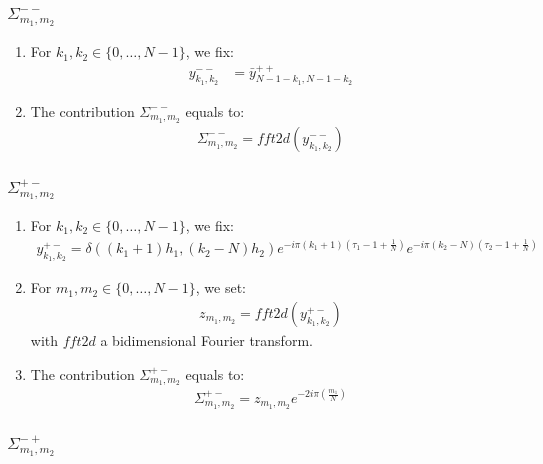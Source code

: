 \subsubsection{\texorpdfstring{$\Sigma_{m_1,m_2}^{--}$}{sigma--}}

\begin{enumerate}
\item For $k_1,k_2\in\{0,\hdots,N-1\}$, we fix:
\begin{align*}
y^{--}_{k_1,k_2}&=\bar{y}^{++}_{N-1-k_1,N-1-k_2}
\end{align*}
\item The contribution $\Sigma_{m_1,m_2}^{--}$ equals to:
\begin{align*}
  \Sigma_{m_1,m_2}^{--}=fft2d(y^{--}_{k_1,k_2})
\end{align*}
\end{enumerate}

\subsubsection{\texorpdfstring{$\Sigma_{m_1,m_2}^{+-}$}{sigma+-}}

\begin{enumerate}
\item For $k_1,k_2\in\{0,\hdots,N-1\}$, we fix:
\begin{align*}
y^{+-}_{k_1,k_2}= \delta((k_1+1)h_1,(k_2-N)h_2)e^{-i\pi (k_1+1)\left(\tau_1-1+\frac{1}{N}\right)}e^{-i\pi (k_2-N)\left(\tau_2-1+\frac{1}{N}\right)}
\end{align*}
\item For $m_1,m_2\in\{0,\hdots,N-1\}$, we set:
\begin{align*}
  z_{m_1,m_2}=fft2d(y^{+-}_{k_1,k_2})
\end{align*}
with $fft2d$ a bidimensional Fourier transform.
\item The contribution $\Sigma_{m_1,m_2}^{+-}$ equals to:
\begin{align*}
  \Sigma_{m_1,m_2}^{+-}=z_{m_1,m_2}e^{-2i\pi\left(\frac{m_1}{N}\right)}
\end{align*}
\end{enumerate}


\subsubsection{\texorpdfstring{$\Sigma_{m_1,m_2}^{-+}$}{sigma-+}}

